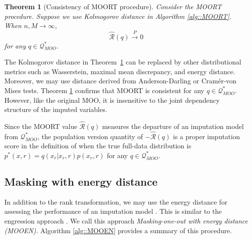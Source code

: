 \documentclass[aos, preprint]{imsart}
\theoremstyle{plain}
\newtheorem{theorem}{Theorem}[section]
\theoremstyle{definition}
\let\hat\widehat
\begin{document}
\begin{theorem}[Consistency of  MOORT procedure]
\label{thm::MOORT}
Consider the MOORT procedure.
Suppose we use Kolmogorov distance in Algorithm \ref{alg::MOORT}.
When $n,M\rightarrow\infty$, 
$$
\hat{\mathcal{R}}(q)
\overset{P}{\rightarrow} 0
$$
for any $q \in \mathcal{Q}^*_{MOO}$.
\end{theorem}


The Kolmogorov distance in Theorem~\ref{thm::MOORT} can be replaced by other distributional metrics such as Wasserstein, 
maximal mean discrepancy, and energy distance.
Moreover, we may use distance derived from Anderson-Darling or Cram{\'e}r-von Mises tests.
Theorem \ref{thm::MOORT} confirms that MOORT is consistent for any $q \in \mathcal{Q}^*_{MOO}$. 
However, like the original MOO, it is insensitive to the joint dependency structure of the imputed variables. 


Since the MOORT value $\hat{\mathcal{R}}(q)$ measures the departure of an imputation model
from $\mathcal{Q}^*_{MOO}$, 
the population version quantity of $-\hat{\mathcal{R}}(q)$ is a proper imputation score in the definition of \cite{naf2023imputation}
when the true full-data distribution is $ p^*(x,r) = q(x_{\bar r}|x_r, r) p(x_r,r)$ for any $q\in \mathcal{Q}^*_{MOO}$.



\subsection{Masking with energy distance}

In addition to the rank transformation, we may use the energy distance \citep{rizzo2016energy,szekely2013energy} for assessing the performance
of an imputation model \citep{grzesiak2025needdozensmethodsreal}. This is similar to the engression approach \citep{shen2025engression}.
We call this approach \emph{Masking-one-out with energy distance (MOOEN).}
Algorithm \ref{alg::MOOEN} provides a summary of this procedure.
\end{document}
